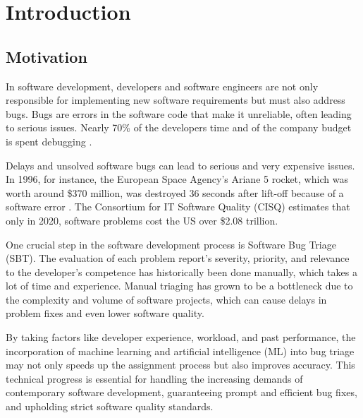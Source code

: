 
%

\chapter{Introduction}
\label{cha:introduction}


\section{Motivation}
\label{sec:motivation}

In software development, developers and software engineers are not only responsible for implementing new software requirements but must also address bugs. Bugs are errors in the software code that make it unreliable, often leading to serious issues.  Nearly 70\% of the developers time and of the company budget is spent debugging \cite{Minelli2015, Xuan2015, Boehm2011, Hooimeijer2007}.

Delays and unsolved software bugs can lead to serious and very expensive issues. In 1996, for instance, the European Space Agency's Ariane 5 rocket, which was worth around \$370 million, was destroyed 36 seconds after lift-off because of a software error \cite{Ariane5}. The Consortium for IT Software Quality (CISQ) estimates that only in 2020, software problems cost the US over \$2.08 trillion. 

One crucial step in the software development process is Software Bug Triage (SBT). The evaluation of each problem report's severity, priority, and relevance to the developer's competence has historically been done manually, which takes a lot of time and experience. Manual triaging has grown to be a bottleneck due to the complexity and volume of software projects, which can cause delays in problem fixes and even lower software quality. 

By taking factors like developer experience, workload, and past performance, the incorporation of machine learning and artificial intelligence (ML) into bug triage may not only speeds up the assignment process but also improves accuracy. This technical progress is essential for handling the increasing demands of contemporary software development, guaranteeing prompt and efficient bug fixes, and upholding strict software quality standards.


